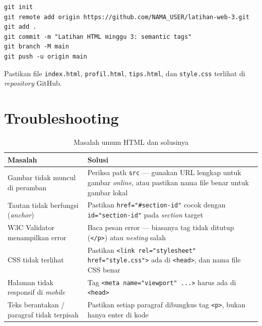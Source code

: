 \begin{lstlisting}[caption={Perintah push ke GitHub}, label={lst:m03-git}]
git init
git remote add origin https://github.com/NAMA_USER/latihan-web-3.git
git add .
git commit -m "Latihan HTML minggu 3: semantic tags"
git branch -M main
git push -u origin main
\end{lstlisting}

\begin{tip}
Pastikan file \texttt{index.html}, \texttt{profil.html}, \texttt{tips.html}, dan \texttt{style.css} terlihat di \emph{repository} GitHub.
\end{tip}

\section{Troubleshooting}
\label{sec:m03-troubleshoot}

\begin{table}[ht]
\centering
\caption{Masalah umum HTML dan solusinya}
\label{tab:m03-troubleshoot}
\small
\begin{tabular}{p{4.5cm}p{8cm}}
\toprule
\textbf{Masalah} & \textbf{Solusi} \\
\midrule
Gambar tidak muncul di peramban & Periksa path \texttt{src} --- gunakan URL lengkap untuk gambar \emph{online}, atau pastikan nama file benar untuk gambar lokal \\
Tautan tidak berfungsi (\emph{anchor}) & Pastikan \texttt{href="\#section-id"} cocok dengan \texttt{id="section-id"} pada \emph{section} target \\
W3C Validator menampilkan error & Baca pesan error --- biasanya tag tidak ditutup (\texttt{</p>}) atau \emph{nesting} salah \\
CSS tidak terlihat & Pastikan \texttt{<link rel="stylesheet" href="style.css">} ada di \texttt{<head>}, dan nama file CSS benar \\
Halaman tidak responsif di \emph{mobile} & Tag \texttt{<meta name="viewport" ...>} harus ada di \texttt{<head>} \\
Teks berantakan / paragraf tidak terpisah & Pastikan setiap paragraf dibungkus tag \texttt{<p>}, bukan hanya enter di kode \\
\bottomrule
\end{tabular}
\end{table}

